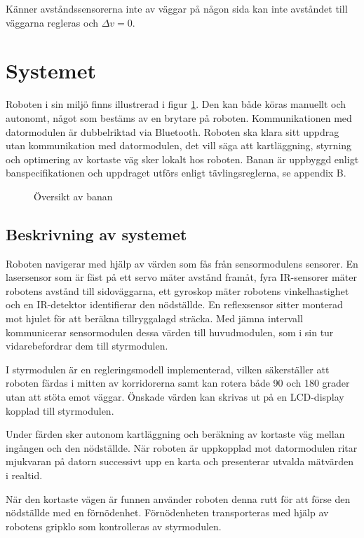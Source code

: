 \documentclass[11pt]{article}
\begin{document}
\begin{flushleft}
Känner avståndssensorerna inte av väggar på någon sida kan inte avståndet till väggarna regleras och $\Delta v = 0$.

\pagebreak

\section{Systemet}
Roboten i sin miljö finns illustrerad i figur \ref{system}. Den kan både köras manuellt och autonomt, något som bestäms av en brytare på roboten. Kommunikationen med datormodulen är dubbelriktad via Bluetooth\textsuperscript{\circledR}. Roboten ska klara sitt uppdrag utan kommunikation med datormodulen, det vill säga att kartläggning, styrning och optimering av kortaste väg sker lokalt hos roboten. Banan är uppbyggd enligt banspecifikationen och uppdraget utförs enligt tävlingsreglerna, se appendix B.

\begin{figure}[htbp]
\centering
\noindent\resizebox{.8\linewidth}{!}{
	}
	\caption{Översikt av banan\label{system}}	
\end{figure}

\subsection{Beskrivning av systemet}

Roboten navigerar med hjälp av värden som fås från sensormodulens sensorer. En lasersensor som är fäst på ett servo mäter avstånd framåt, fyra IR-sensorer mäter robotens avstånd till sidoväggarna, ett gyroskop mäter robotens vinkelhastighet och en IR-detektor identifierar den nödställde. En reflexsensor sitter monterad mot hjulet för att beräkna tillryggalagd sträcka. Med jämna intervall kommunicerar sensormodulen dessa värden till huvudmodulen, som i sin tur vidarebefordrar dem till styrmodulen. 


I styrmodulen är en regleringsmodell implementerad, vilken säkerställer att roboten färdas i mitten av korridorerna samt kan rotera både 90 och 180 grader utan att stöta emot väggar. Önskade värden kan skrivas ut på en LCD-display kopplad till styrmodulen.

Under färden sker autonom kartläggning och beräkning av kortaste väg mellan ingången och den nödställde. När roboten är uppkopplad mot datormodulen ritar mjukvaran på datorn successivt upp en karta och presenterar utvalda mätvärden i realtid. 

När den kortaste vägen är funnen använder roboten denna rutt för att förse den nödställde med en förnödenhet. Förnödenheten transporteras med hjälp av robotens gripklo som kontrolleras av styrmodulen.


\end{flushleft}
\end{document}
